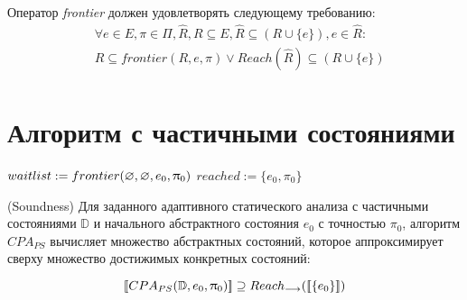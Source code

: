 Оператор \emph{frontier} должен удовлетворять следующему требованию:
\begin{equation}
\label{cpa_frontier_transfer_eq}
\begin{aligned}
& \forall e \in E, \pi \in \Pi, \widehat{R}, R \subseteq E, \widehat{R} \subseteq (R \cup \{e\}), e\in \widehat{R} : \\ 
&  
\widehat{R} \subseteq frontier(R, e, \pi) \lor Reach(\widehat{R}) \subseteq (R \cup \{e\}) \\ 
\end{aligned}
\end{equation}

\section{Алгоритм с частичными состояниями}

\begin{algorithm}[H]
{\color{blue}
 $waitlist := frontier(\varnothing, \varnothing, e_0, \uppi_0)$\;
}
 $reached := \{e_0,\pi_0\} $\;


 \caption{$CPA_{PS}(\mathbb{D}, e_0, \pi_0)$}
 \label{cpata_algorithm_ps}
\end{algorithm}

\begin{thrm}
(Soundness) Для заданного адаптивного статического анализа с частичными состояниями $\mathbb{D}$ и начального абстрактного состояния $e_0$ с точностью $\pi_0$, алгоритм $CPA_{PS}$ вычисляет множество абстрактных состояний, которое аппроксимирует сверху множество достижимых конкретных состояний:

$$[\![ CPA_{PS}(\mathbb{D}, e_0, \uppi_0) ]\!] \supseteq Reach_{\longrightarrow}([\![ \{e_0\} ]\!])$$

\end{thrm}

